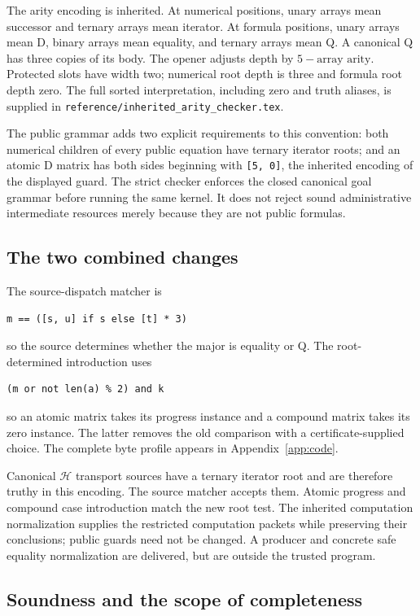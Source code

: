 \documentclass[11pt,letterpaper]{article}
\theoremstyle{definition}\newtheorem{definition}[theorem]{Definition}
\theoremstyle{remark}\newtheorem{remark}[theorem]{Remark}
\newcommand{\Hcal}{\mathcal H}\newcommand{\Kcal}{\mathcal K}
\newcommand{\file}[1]{{\urlstyle{tt}\nolinkurl{#1}}}
\begin{document}
The arity encoding is inherited. At numerical positions, unary arrays
mean successor and ternary arrays mean iterator. At formula positions,
unary arrays mean D, binary arrays mean equality, and ternary arrays
mean Q. A canonical Q has three copies of its body. The opener adjusts
depth by \(5-\text{array arity}\). Protected slots have width two;
numerical root depth is three and formula root depth zero. The full
sorted interpretation, including zero and truth aliases, is supplied
in \file{reference/inherited_arity_checker.tex}.

The public grammar adds two explicit requirements to this convention:
both numerical children of every public equation have ternary iterator
roots; and an atomic D matrix has both sides beginning with
\file{[5, 0]}, the inherited encoding of the displayed guard. The
strict checker enforces the closed canonical goal grammar before
running the same kernel. It does not reject sound administrative
intermediate resources merely because they are not public formulas.

\subsection{The two combined changes}

The source-dispatch matcher is
\begin{lstlisting}
m == ([s, u] if s else [t] * 3)
\end{lstlisting}
so the source determines whether the major is equality or Q.
The root-determined introduction uses
\begin{lstlisting}
(m or not len(a) % 2) and k
\end{lstlisting}
so an atomic matrix takes its progress instance and a compound matrix
takes its zero instance. The latter removes the old comparison with a
certificate-supplied choice. The complete byte profile appears in
Appendix~\ref{app:code}.

Canonical \(\Hcal\) transport sources have a ternary iterator root
and are therefore truthy in this encoding. The source matcher accepts
them. Atomic progress and compound case introduction match the new
root test. The inherited computation normalization supplies the
restricted computation packets while preserving their conclusions;
public guards need not be changed. A producer and concrete safe
equality normalization are delivered, but are outside the trusted
program.

\subsection{Soundness and the scope of completeness}
\end{document}
